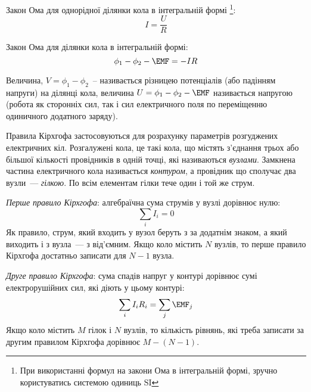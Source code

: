 \begin{Theory}
Закон Ома для однорідної ділянки кола в інтегральній формі \footnote{При використанні формул на закони Ома в інтегральній формі, зручно користуватись системою одиниць $\mathrm{SI}$}:
	\begin{equation}
		I = \frac{U}{R}
	\end{equation}

Закон Ома для ділянки кола в інтегральній формі:
	\begin{equation}
		\phi_1 - \phi_2 - \EMF = - I R
	\end{equation}

Величина, $V = \phi_1 - \phi_2$~-- називається різницею потенціалів (або падінням напруги) на ділянці кола, величина $U = \phi_1 - \phi_2 - \EMF$ називається напругою (робота як сторонніх сил, так і сил електричного поля по переміщенню одиничного додатного заряду).

\begin{center}
\end{center}

Правила Кірхгофа застосовуються для розрахунку параметрів розгуджених електричних кіл. Розгалужені кола, це такі кола, що містять з'єднання трьох або більшої кількості провідників в одній точці, які називаються \textit{вузлами}. Замкнена частина електричного кола називається \textit{контуром}, а провідник що сполучає два вузли~--- \textit{гілкою}. По всім елементам гілки тече один і той же струм.

\textit{Перше правило Кірхгофа}: алгебраїчна сума струмів у вузлі дорівнює нулю:
\begin{equation}
	\sum\limits_{i} I_i = 0
\end{equation}
Як правило, струм, який входить у вузол беруть з за додатнім знаком, а який виходить і з вузла~--- з від'ємним. Якщо коло містить $N$ вузлів, то перше правило Кірхгофа достатньо записати для $N - 1$ вузла.

\textit{Друге правило Кірхгофа}: сума спадів напруг у контурі дорівнює сумі електрорушійних сил, які діють у цьому контурі:
\begin{equation}
	\sum\limits_{i} I_i R_i = \sum\limits_{j}\EMF_j
\end{equation}
Якщо коло містить $M$ гілок і $N$ вузлів, то кількість рівнянь, які треба записати за другим правилом Кірхгофа  дорівнює $M - (N - 1)$.
\end{Theory}

